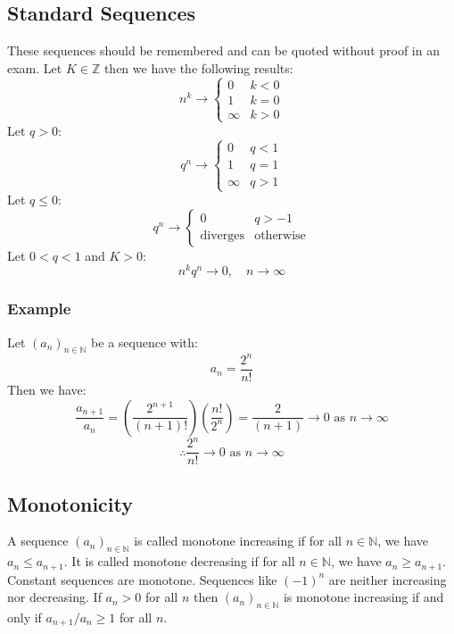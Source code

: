 \documentclass[12pt]{article}
\newcommand{\seq}[2]{(#1_#2)_{#2\in\mathbb{N}}}
\begin{document}
\subsection{Standard Sequences}
These sequences should be remembered and can be quoted without proof in an exam. Let \(K\in\mathbb{Z}\) then we have the following results:
\[n^k\to\begin{cases}
    0 & k<0 \\
    1 & k=0 \\
    \infty & k>0
\end{cases}\]
Let \(q>0\):
\[q^n\to\begin{cases}
    0 & q<1 \\
    1 & q=1 \\
    \infty & q>1
\end{cases}\]
Let \(q\leq 0\):
\[q^n\to\begin{cases}
    0 & q>-1 \\
    \text{diverges} & \text{otherwise}
\end{cases}\]
Let \(0<q<1\) and \(K>0\):
\[n^kq^n\to 0,\quad n\to\infty\]
\subsubsection*{Example}
Let \(\seq{a}{n}\) be a sequence with:
\[a_n=\frac{2^n}{n!}\]
Then we have:
\[\frac{a_{n+1}}{a_n}=\left(\frac{2^{n+1}}{(n+1)!}\right)\left(\frac{n!}{2^n}\right)=\frac{2}{(n+1)}\to 0\text{ as }n\to\infty\]
\[\therefore \frac{2^n}{n!}\to 0\text{ as }n\to\infty\]
\subsection{Monotonicity}
A sequence \(\seq{a}{n}\) is called monotone increasing if for all \(n\in\mathbb{N}\), we have \(a_n\leq a_{n+1}\). It is called monotone decreasing if for all \(n\in\mathbb{N}\), we have \(a_n\geq a_{n+1}\). Constant sequences are monotone. Sequences like \((-1)^n\) are neither increasing nor decreasing. If \(a_n > 0\) for all \(n\) then \(\seq{a}{n}\) is monotone increasing if and only if \(a_{n+1}/a_n\geq 1\) for all \(n\).
\end{document}
